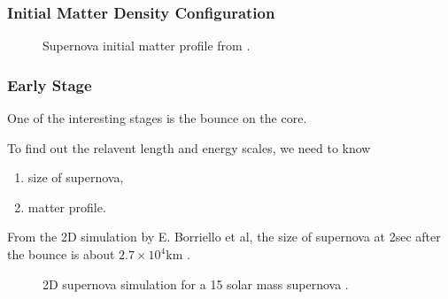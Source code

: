 \documentclass[letterpaper,12pt,english]{sphinxmanual}
\begin{document}
\subsubsection{Initial Matter Density Configuration}
\label{\detokenize{matter-stimulated/scales:initial-matter-density-configuration}}\begin{figure}[htbp]
\centering
\capstart

\noindent{}
\caption{Supernova initial matter profile from \label{\detokenize{matter-stimulated/scales:id1}}{\hyperref[\detokenize{matter-stimulated/scales:shigeyama1990}]{\sphinxcrossref{{[}shigeyama1990{]}}}}.}\label{\detokenize{matter-stimulated/scales:id5}}\end{figure}


\subsubsection{Early Stage}
\label{\detokenize{matter-stimulated/scales:early-stage}}
One of the interesting stages is the bounce on the core.

To find out the relavent length and energy scales, we need to know
\begin{enumerate}
\item {} 
size of supernova,

\item {} 
matter profile.

\end{enumerate}

From the 2D simulation by E. Borriello et al, the size of supernova at 2sec after the bounce is about \(2.7\times 10^4\mathrm{km}\) \label{\detokenize{matter-stimulated/scales:id2}}{\hyperref[\detokenize{matter-stimulated/scales:eborriello2014}]{\sphinxcrossref{{[}EBorriello2014{]}}}}.
\begin{figure}[htbp]
\centering
\capstart

\noindent{}
\caption{2D supernova simulation for a 15 solar mass supernova \label{\detokenize{matter-stimulated/scales:id3}}{\hyperref[\detokenize{matter-stimulated/scales:eborriello2014}]{\sphinxcrossref{{[}EBorriello2014{]}}}}.}\label{\detokenize{matter-stimulated/scales:id6}}\end{figure}
\end{document}

